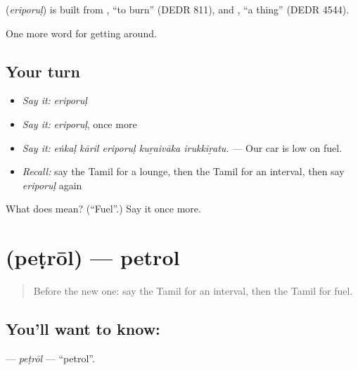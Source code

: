 \begin{cousinweb}
\textbf{} (\emph{eriporuḷ}) is built from , \textquotedblleft{}to burn\textquotedblright{} (DEDR 811), and , \textquotedblleft{}a thing\textquotedblright{} (DEDR 4544).
\end{cousinweb}

\begin{grammarlens}[title={What you've built}]
One more word for getting around.
\end{grammarlens}

\subsection*{Your turn}
\begin{itemize}
\raggedright
  \item \emph{Say it:} \emph{eriporuḷ}
  \item \emph{Say it:} \emph{eriporuḷ}, once more
  \item \emph{Say it:} \emph{eṅkaḷ kāril eriporuḷ kuṟaivāka irukkiṟatu.} — Our car is low on fuel.
  \item \emph{Recall:} say the Tamil for a lounge, then the Tamil for an interval, then say \emph{eriporuḷ} again
\end{itemize}

\begin{tcolorbox}[breakable,colback=teal!4,colframe=teal!35!black,title={Before you move on}]
What does  mean? (\textquotedblleft{}Fuel\textquotedblright{}.) Say it once more.
\end{tcolorbox}
\section[\texorpdfstring{\ta{பெட்ரோல்} (peṭrōl)}{பெட்ரோல் (peṭrōl)}]{ (peṭrōl) — petrol}

\label{lesson:TA-C406-petrol}



\begin{quote}
Before the new one: say the Tamil for an interval, then the Tamil for fuel.
\end{quote}

\subsection*{You'll want to know: }
\textbf{} — \emph{peṭrōl} — \textquotedblleft{}petrol\textquotedblright{}.

